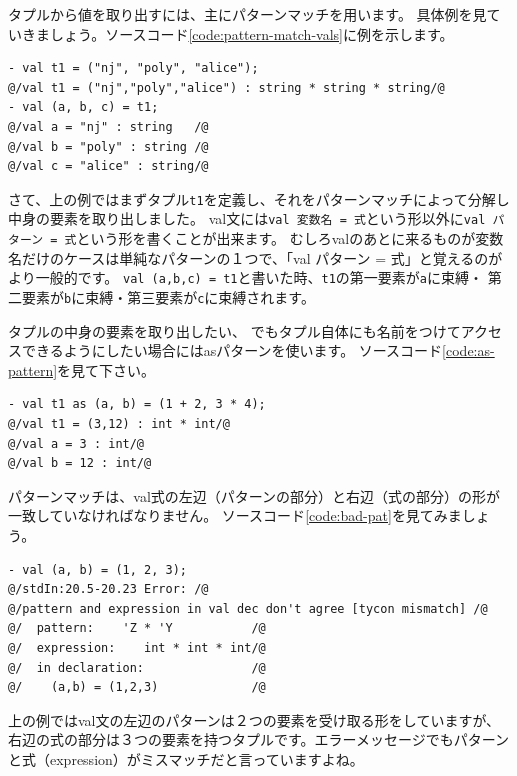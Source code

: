 \documentclass[11pt,a4paper]{article}
\begin{document}
タプルから値を取り出すには、主にパターンマッチを用います。
具体例を見ていきましょう。ソースコード\ref{code:pattern-match-vals}に例を示します。

\begin{lstlisting}[caption=val文でパターンマッチ,label=code:pattern-match-vals]
- val t1 = ("nj", "poly", "alice");
@/val t1 = ("nj","poly","alice") : string * string * string/@
- val (a, b, c) = t1;
@/val a = "nj" : string   /@
@/val b = "poly" : string /@
@/val c = "alice" : string/@
\end{lstlisting}

さて、上の例ではまずタプル\lstinline{t1}を定義し、それをパターンマッチによって分解し中身の要素を取り出しました。
val文には\lstinline{val 変数名 = 式}という形以外に\lstinline{val パターン = 式}という形を書くことが出来ます。
むしろvalのあとに来るものが変数名だけのケースは単純なパターンの１つで、「val パターン = 式」と覚えるのがより一般的です。
\lstinline{val (a,b,c) = t1}と書いた時、\lstinline{t1}の第一要素が\lstinline{a}に束縛・
第二要素が\lstinline{b}に束縛・第三要素が\lstinline{c}に束縛されます。

タプルの中身の要素を取り出したい、
でもタプル自体にも名前をつけてアクセスできるようにしたい場合にはasパターンを使います。
ソースコード\ref{code:as-pattern}を見て下さい。

\begin{lstlisting}[caption=asパターン,label=code:as-pattern]
- val t1 as (a, b) = (1 + 2, 3 * 4);
@/val t1 = (3,12) : int * int/@
@/val a = 3 : int/@
@/val b = 12 : int/@
\end{lstlisting}

パターンマッチは、val式の左辺（パターンの部分）と右辺（式の部分）の形が一致していなければなりません。
ソースコード\ref{code:bad-pat}を見てみましょう。
\begin{lstlisting}[caption=型が合わないパターンマッチ,label=code:bad-pat]
- val (a, b) = (1, 2, 3);
@/stdIn:20.5-20.23 Error: /@
@/pattern and expression in val dec don't agree [tycon mismatch] /@
@/  pattern:    'Z * 'Y           /@
@/  expression:    int * int * int/@
@/  in declaration:               /@
@/    (a,b) = (1,2,3)             /@
\end{lstlisting}

上の例ではval文の左辺のパターンは２つの要素を受け取る形をしていますが、右辺の式の部分は３つの要素を持つタプルです。エラーメッセージでもパターンと式（expression）がミスマッチだと言っていますよね。
\end{document}
